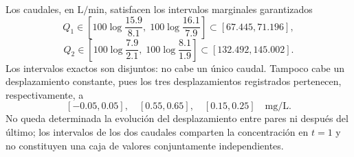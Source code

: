 Los caudales, en \(\mathrm{L/min}\), satisfacen los intervalos marginales garantizados
\[
Q_1\in\left[100\log\frac{15.9}{8.1},\;100\log\frac{16.1}{7.9}\right]
\subset[67.445,71.196],
\]
\[
Q_2\in\left[100\log\frac{7.9}{2.1},\;100\log\frac{8.1}{1.9}\right]
\subset[132.492,145.002].
\]
Los intervalos exactos son disjuntos: no cabe un único caudal. Tampoco cabe un desplazamiento constante, pues los tres desplazamientos registrados pertenecen, respectivamente, a
\[
[-0.05,0.05],\quad[0.55,0.65],\quad[0.15,0.25]\quad\mathrm{mg/L}.
\]
No queda determinada la evolución del desplazamiento entre pares ni después del último; los intervalos de los dos caudales comparten la concentración en \(t=1\) y no constituyen una caja de valores conjuntamente independientes.
